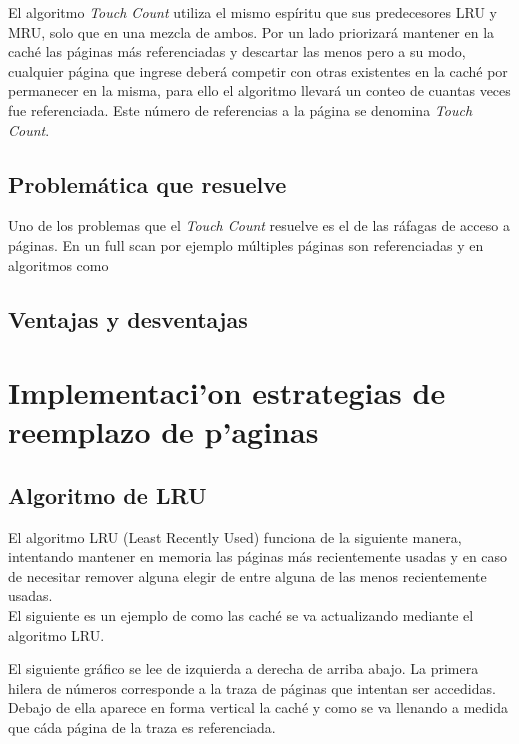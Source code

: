 \documentclass[11pt, a4paper, spanish]{article}
\begin{document}
El algoritmo \textit{Touch Count} utiliza el mismo esp\'iritu que sus predecesores LRU y MRU, solo que en una mezcla de ambos. Por un lado priorizar\'a
mantener en la cach\'e las p\'aginas m\'as referenciadas y descartar las menos pero a su modo, cualquier p\'agina que ingrese deber\'a competir 
con otras existentes en la cach\'e por permanecer en la misma, para ello el algoritmo llevar\'a un conteo de cuantas veces fue referenciada. Este n\'umero
de referencias a la p\'agina se denomina \textit{Touch Count}.

\subsection{Problem\'atica que resuelve}

Uno de los problemas que el \textit{Touch Count} resuelve es el de las r\'afagas de acceso a p\'aginas. En un full scan por ejemplo m\'ultiples p\'aginas
son referenciadas y en algoritmos como 

\subsection{Ventajas y desventajas}

\newpage 
\section{Implementaci'on estrategias de reemplazo de p'aginas}

\subsection{Algoritmo de LRU}

El algoritmo LRU (Least Recently Used) funciona de la siguiente manera, intentando mantener en memoria las p\'aginas m\'as recientemente usadas
y en caso de necesitar remover alguna elegir de entre alguna de las menos recientemente usadas.\\

El siguiente es un ejemplo de como las cach\'e se va actualizando mediante el algoritmo LRU.

El siguiente gr\'afico se lee de izquierda a derecha de arriba abajo. La primera hilera de n\'umeros corresponde a la traza de p\'aginas que intentan ser 
accedidas. Debajo de ella aparece en forma vertical la cach\'e y como se va llenando a medida que c\'ada p\'agina de la traza es referenciada.\\ 
\end{document}
